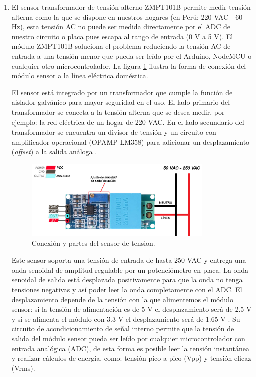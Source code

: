 \begin{enumerate}
\item  {}

El sensor transformador de tensión alterno ZMPT101B permite medir tensión alterna como la que se dispone en nuestros hogares (en Perú: 220 VAC - 60 Hz), esta tensión AC no puede ser medida directamente por el ADC de nuestro circuito o placa pues escapa al rango de entrada (0 V a 5 V). El módulo ZMPT101B soluciona el problema reduciendo la tensión AC de entrada a una tensión menor que pueda ser leído por el Arduino, NodeMCU o cualquier otro microcontrolador. La figura \ref{fig:sensortension} ilustra la forma de conexión del módulo sensor a la línea eléctrica doméstica.

El sensor está integrado por un transformador que cumple la función de aislador galvánico para mayor seguridad en el uso. El lado primario del transformador se conecta a la tensión alterna que se desea medir, por ejemplo: la red eléctrica de un hogar de 220 VAC. En el lado secundario del transformador se encuentra un divisor de tensión y un circuito con amplificador operacional (OPAMP LM358) para adicionar un desplazamiento (\emph{offset}) a la salida análoga \citep{WEBSITE:22}. 

\begin{figure}[htpb]
\centering 
\includegraphics[width=0.85\textwidth]{./Figures/sensortension.png}
\caption{Conexión y partes del sensor de tension.}
\label{fig:sensortension}
\end{figure}


Este sensor soporta una tensión de entrada de hasta 250 VAC y entrega una onda senoidal de amplitud regulable por un potenciómetro en placa. La onda senoidal de salida está desplazada positivamente para que la onda no tenga tensiones negativas y así poder leer la onda completamente con el ADC. El desplazamiento depende de la tensión con la que alimentemos el módulo sensor: si la tensión de alimentación es de 5 V el desplazamiento será de 2.5 V y si se alimenta el módulo con 3.3 V el desplazamiento será de 1.65 V \citep{WEBSITE:23}. Su circuito de acondicionamiento de señal interno permite que la tensión de salida del módulo sensor pueda ser leído por cualquier microcontrolador con entrada analógica (ADC), de esta forma es posible leer la tensión instantánea y realizar cálculos de energía, como: tensión pico a pico (Vpp) y tensión eficaz (Vrms). 


\end{enumerate}
